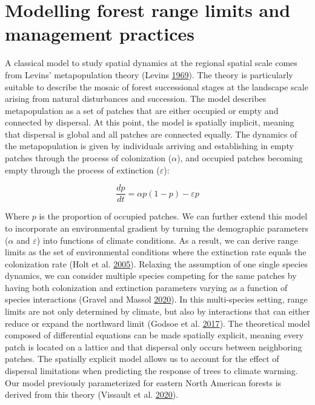 \documentclass[12pt]{article}
\begin{document}
\hypertarget{modelling-forest-range-limits-and-management-practices}{%
\section{Modelling forest range limits and management
practices}\label{modelling-forest-range-limits-and-management-practices}}

A classical model to study spatial dynamics at the regional spatial
scale comes from Levins' metapopulation theory (Levins
\protect\hyperlink{ref-Levins1969}{1969}). The theory is particularly
suitable to describe the mosaic of forest successional stages at the
landscape scale arising from natural disturbances and succession. The
model describes metapopulation as a set of patches that are either
occupied or empty and connected by dispersal. At this point, the model
is spatially implicit, meaning that dispersal is global and all patches
are connected equally. The dynamics of the metapopulation is given by
individuals arriving and establishing in empty patches through the
process of colonization (\(\alpha\)), and occupied patches becoming
empty through the process of extinction (\(\varepsilon\)):

\begin{equation}
\frac{dp}{dt} = \alpha p (1 - p) - \varepsilon p
\label{eq:metapop}\end{equation}

Where \(p\) is the proportion of occupied patches. We can further extend
this model to incorporate an environmental gradient by turning the
demographic parameters (\(\alpha\) and \(\varepsilon\)) into functions
of climate conditions. As a result, we can derive range limits as the
set of environmental conditions where the extinction rate equals the
colonization rate (Holt et al. \protect\hyperlink{ref-Holt2005}{2005}).
Relaxing the assumption of one single species dynamics, we can consider
multiple species competing for the same patches by having both
colonization and extinction parameters varying as a function of species
interactions (Gravel and Massol
\protect\hyperlink{ref-Gravel2020}{2020}). In this multi-species
setting, range limits are not only determined by climate, but also by
interactions that can either reduce or expand the northward limit
(Godsoe et al. \protect\hyperlink{ref-Godsoe2017}{2017}). The
theoretical model composed of differential equations can be made
spatially explicit, meaning every patch is located on a lattice and that
dispersal only occurs between neighboring patches. The spatially
explicit model allows us to account for the effect of dispersal
limitations when predicting the response of trees to climate warming.
Our model previously parameterized for eastern North American forests is
derived from this theory (Vissault et al.
\protect\hyperlink{ref-Vissault2020}{2020}).
\end{document}
